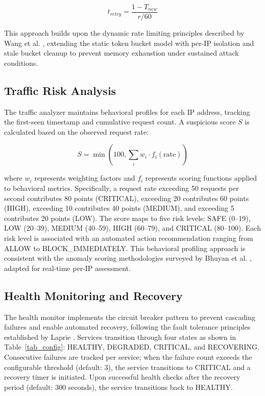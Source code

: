 \documentclass[conference]{IEEEtran}
\begin{document}
\begin{equation}
t_{retry} = \frac{1 - T_{new}}{r / 60}
\label{eq_retry}
\end{equation}

This approach builds upon the dynamic rate limiting principles described by Wang et al. \cite{b15}, extending the static token bucket model with per-IP isolation and stale bucket cleanup to prevent memory exhaustion under sustained attack conditions.

\subsection{Traffic Risk Analysis}

The traffic analyzer maintains behavioral profiles for each IP address, tracking the first-seen timestamp and cumulative request count. A suspicious score $S$ is calculated based on the observed request rate:

\begin{equation}
S = \min\left(100, \sum_{i} w_i \cdot f_i(\text{rate})\right)
\label{eq_score}
\end{equation}

where $w_i$ represents weighting factors and $f_i$ represents scoring functions applied to behavioral metrics. Specifically, a request rate exceeding 50 requests per second contributes 80 points (CRITICAL), exceeding 20 contributes 60 points (HIGH), exceeding 10 contributes 40 points (MEDIUM), and exceeding 5 contributes 20 points (LOW). The score maps to five risk levels: SAFE (0--19), LOW (20--39), MEDIUM (40--59), HIGH (60--79), and CRITICAL (80--100). Each risk level is associated with an automated action recommendation ranging from ALLOW to BLOCK\_IMMEDIATELY. This behavioral profiling approach is consistent with the anomaly scoring methodologies surveyed by Bhuyan et al. \cite{b13}, adapted for real-time per-IP assessment.

\subsection{Health Monitoring and Recovery}

The health monitor implements the circuit breaker pattern \cite{b9} to prevent cascading failures and enable automated recovery, following the fault tolerance principles established by Laprie \cite{b17}. Services transition through four states as shown in Table~\ref{tab_config}: HEALTHY, DEGRADED, CRITICAL, and RECOVERING. Consecutive failures are tracked per service; when the failure count exceeds the configurable threshold (default: 3), the service transitions to CRITICAL and a recovery timer is initiated. Upon successful health checks after the recovery period (default: 300 seconds), the service transitions back to HEALTHY.
\end{document}
